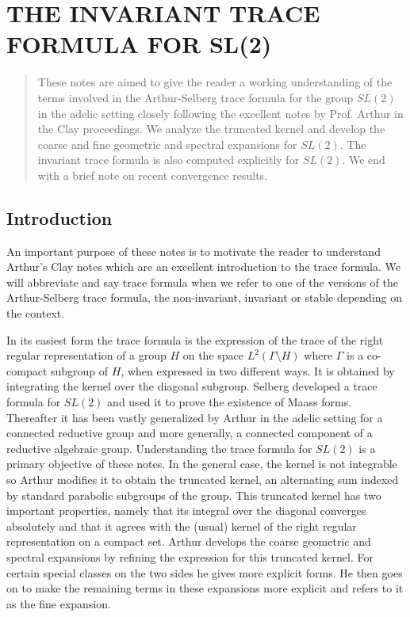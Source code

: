 \documentclass{ims9x6}
\def\bs{\setminus}
\def\Ltwo{L^2}
\begin{document}
\chapter{THE INVARIANT TRACE FORMULA FOR SL(2)}

\author{Abhishek Parab}
\address{abhishekparab@gmail.com}

\setcounter{tocdepth}{1}		%

\begin{abstract}
	These notes are aimed to give the reader a working understanding of the terms involved in the Arthur-Selberg trace formula for the group $SL(2)$ in the adelic setting closely following the excellent notes \cite{clay} by Prof. Arthur in the Clay proceedings. We analyze the truncated kernel and develop the coarse and fine geometric and spectral expansions for $SL(2)$. The invariant trace formula is also computed explicitly for $SL(2)$. We end with a brief note on recent convergence results. 
\end{abstract}

\section{Introduction} \label{sec_intro}
	
	An important purpose of these notes is to motivate the reader to understand Arthur's Clay notes \cite{clay} which are an excellent introduction to the trace formula. We will abbreviate and say trace formula when we refer to one of the versions of the Arthur-Selberg trace formula, the non-invariant, invariant or stable depending on the context. 
	
	In its easiest form the trace formula is the expression of the trace of the right regular representation of a group $H$ on the space $\Ltwo(\Gamma\bs H)$ where $\Gamma$ is a co-compact subgroup of $H$, when expressed in two different ways. It is obtained by integrating the kernel over the diagonal subgroup. Selberg developed a trace formula for $SL(2)$ and used it to prove the existence of Maass forms. Thereafter it has been vastly generalized by Arthur in the adelic setting for a connected reductive group and more generally, a connected component of a reductive algebraic group. Understanding the trace formula for $SL(2)$ is a primary objective of these notes. In the general case, the kernel is not integrable so Arthur modifies it to obtain the truncated kernel, an alternating sum indexed by standard parabolic subgroups of the group. This truncated kernel has two important properties, namely that its integral over the diagonal converges absolutely and that it agrees with the (usual) kernel of the right regular representation on a compact set. Arthur develops the coarse geometric and spectral expansions by refining the expression for this truncated kernel. For certain special classes on the two sides he gives more explicit forms. He then goes on to make the remaining terms in these expansions more explicit and refers to it as the fine expansion. 
	
\end{document}
